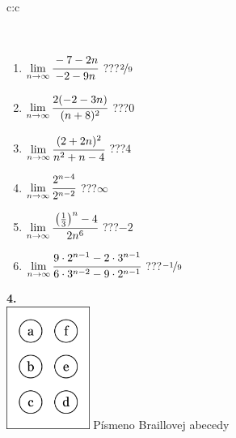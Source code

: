 \documentclass[10pt]{report}
\begin{document}
\begin{tabular}{c:c}
\begin{minipage}[c][104.5mm][t]{0.5\linewidth}
\begin{center}
\begin{minipage}{0.95\linewidth}
\begin{center}
\end{center}
\end{minipage}
\\[1mm]
\begin{minipage}{0.79\linewidth}
\begin{center}
\begin{varwidth}{\linewidth}
\begin{enumerate}
\normalsize
\item $\lim\limits_{n\to\infty}\cfrac{-7-2n}{-2-9n}$\quad \dotfill\; ???\;\dotfill \quad $\nicefrac{2}{9}$
\item $\lim\limits_{n\to\infty}\cfrac{2(-2-3n)}{(n+8)^2}$\quad \dotfill\; ???\;\dotfill \quad $0$
\item $\lim\limits_{n\to\infty}\cfrac{(2+2n)^2}{n^2+n-4}$\quad \dotfill\; ???\;\dotfill \quad $4$
\item $\lim\limits_{n\to\infty}\cfrac{2^{n-4}}{2^{n-2}}$\quad \dotfill\; ???\;\dotfill \quad $\infty$
\item $\lim\limits_{n\to\infty}\cfrac{\left(\frac{1}{3}\right)^n -4}{2n^{6}}$\quad \dotfill\; ???\;\dotfill \quad $-2$
\item $\lim\limits_{n\to\infty}\cfrac{9\cdot 2^{n-1}-2\cdot 3^{n-1}}{6\cdot 3^{n-2}-9\cdot 2^{n-1}}$\quad \dotfill\; ???\;\dotfill \quad $\nicefrac{-1}{9}$
\end{enumerate}
\end{varwidth}
\end{center}
\end{minipage}
\begin{minipage}{0.20\linewidth}
\begin{center}
{\Huge\bfseries 4.} \\[2mm]
\includegraphics[height=40mm]{../images/braille.png}
{\small Písmeno Braillovej abecedy}
\end{center}
\end{minipage}
\end{center}
\end{minipage}
%
\end{tabular}
\newpage
\thispagestyle{empty}
\end{document}
